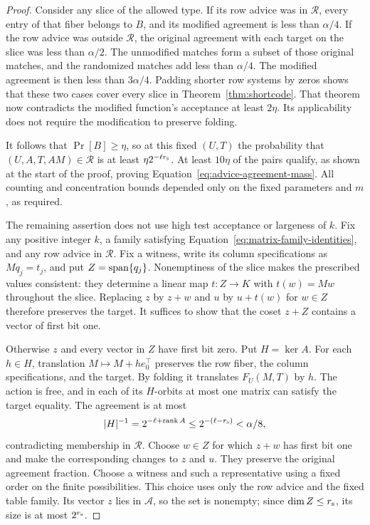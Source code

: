 \begin{proof}
Consider any slice of the allowed type.  If its row advice was in $\mathcal R$, every
entry of that fiber belongs to $B$, and its modified agreement is less
than $\alpha/4$.  If the row advice was outside $\mathcal R$, the original agreement
with each target on the slice was less than $\alpha/2$.  The unmodified
matches form a subset of those original matches, and the randomized
matches add less than $\alpha/4$.  The modified agreement is then less
than $3\alpha/4$.  Padding shorter row systems by zeros shows that these
two cases cover every slice in Theorem~\ref{thm:shortcode}.  That theorem
now contradicts the modified function's acceptance at least $2\eta$.
Its applicability does not require the modification to preserve folding.

It follows that $\Pr[B]\ge\eta$, so at this fixed $(U,T)$ the
probability that $(U,A,T,AM)\in\mathcal R$ is at least
$\eta2^{-\ell r_{\rm s}}$.  At least $10\eta$ of the pairs qualify,
as shown at the start of the proof, proving
Equation~\eqref{eq:advice-agreement-mass}.  All counting and concentration
bounds depended only on the fixed parameters and $m$, as required.

The remaining assertion does not use high test acceptance or largeness of
$k$.  Fix any positive integer $k$, a family satisfying
Equation~\eqref{eq:matrix-family-identities}, and any row advice in $\mathcal R$.
Fix a witness, write its column specifications as $Mq_j=t_j$, and put
$Z=\operatorname{span}\{q_j\}$.  Nonemptiness of the slice makes the prescribed values
consistent: they determine a linear map $t:Z\to K$ with $t(w)=Mw$
throughout the slice.  Replacing $z$ by $z+w$ and $u$ by $u+t(w)$ for
$w\in Z$ therefore preserves the target.  It suffices to show that the
coset $z+Z$ contains a vector of first bit one.

Otherwise $z$ and every vector in $Z$ have first bit zero.  Put $H=\ker A$.
For each $h\in H$, translation $M\mapsto M+h e_0^\top$ preserves the
row fiber, the column specifications, and the target.  By folding it
translates $F_U(M,T)$ by $h$.  The action is free, and in each of its
$H$-orbits at most one matrix can satisfy the target equality.  The
agreement is at most
\[
 |H|^{-1}=2^{-\ell+\operatorname{rank} A}
 \le2^{-(\ell-r_{\rm s})}<\alpha/8,
\]
contradicting membership in $\mathcal R$.  Choose $w\in Z$ for which $z+w$ has first bit one
and make the corresponding changes to $z$ and $u$.  They preserve the
original agreement fraction.  Choose a witness and such a representative
using a fixed order on the finite possibilities.  This choice uses only
the row advice and the fixed table family.  Its vector $z$ lies in
$\mathcal A$, so the set is nonempty; since $\dim Z\le r_{\rm s}$,
its size is at most $2^{r_{\rm s}}$.
\end{proof}

